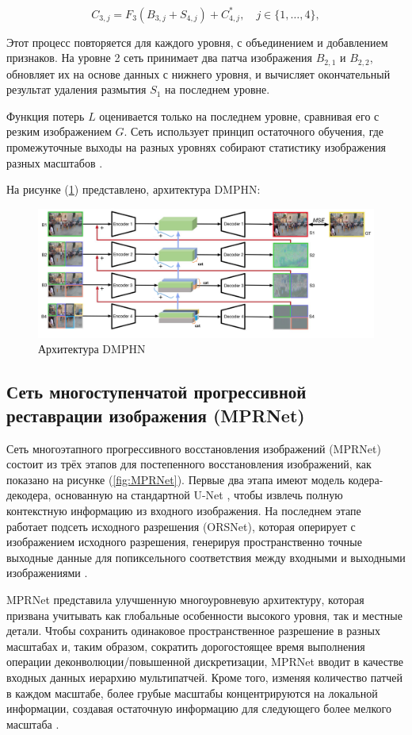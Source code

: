 \begin{equation}
	C_{3,j} = F_{3}(B_{3,j} + S_{4,j}) + C_{4,j}^{\ast}, \quad j \in \{1, \dots, 4\},
\end{equation}

Этот процесс повторяется для каждого уровня, с объединением и добавлением признаков. На уровне 2 сеть принимает два патча изображения \(B_{2,1}\) и \(B_{2,2}\), обновляет их на основе данных с нижнего уровня, и вычисляет окончательный результат удаления размытия \(S_{1}\) на последнем уровне.

Функция потерь \(L\) оценивается только на последнем уровне, сравнивая его с резким изображением \(G\). Сеть использует принцип остаточного обучения, где промежуточные выходы на разных уровнях собирают статистику изображения разных масштабов \cite{zhang2019deep}.

На рисунке (\ref{fig:dmphn}) представлено, архитектура DMPHN: 
\begin{figure}[H]
	\centering
	\includegraphics[width=0.8\linewidth]{assets/DMPHN.png}
	\caption{Архитектура DMPHN}
	\label{fig:dmphn}
\end{figure}


\subsection{Сеть многоступенчатой прогрессивной реставрации изображения (MPRNet)}

Сеть многоэтапного прогрессивного восстановления изображений (MPRNet) состоит из трёх этапов для постепенного восстановления изображений, как показано на рисунке (\ref{fig:MPRNet}). Первые два этапа имеют модель кодера-декодера, основанную на стандартной U-Net \cite{unet2015}, чтобы извлечь полную контекстную информацию из входного изображения. На последнем этапе работает подсеть исходного разрешения (ORSNet), которая оперирует с изображением исходного разрешения, генерируя пространственно точные выходные данные для попиксельного соответствия между входными и выходными изображениями \cite{zamir2021multi}.

MPRNet представила улучшенную многоуровневую архитектуру, которая призвана учитывать как глобальные особенности высокого уровня, так и местные детали. Чтобы сохранить одинаковое пространственное разрешение в разных масштабах и, таким образом, сократить дорогостоящее время выполнения операции деконволюции/повышенной дискретизации, MPRNet вводит в качестве входных данных иерархию мультипатчей. Кроме того, изменяя количество патчей в каждом масштабе, более грубые масштабы концентрируются на локальной информации, создавая остаточную информацию для следующего более мелкого масштаба \cite{rajaei2023analysis}.

